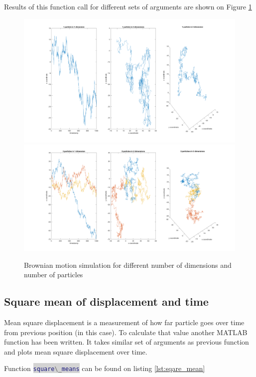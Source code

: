 \documentclass[onecolumn]{article}
\newcommand{\inlinecode}[2]{\colorbox{lightgray}{\lstinline[language=#1]$#2$}}
\begin{document}
\newpage
Results of this function call for different sets of arguments are shown on Figure \ref{fig:brownian}
\begin{figure}[H]
\includegraphics[width=\textwidth]{motion_1p}
\includegraphics[width=\textwidth]{motion_3p}
\caption{Brownian motion simulation for different number of dimensions and number of particles}
\label{fig:brownian}
\end{figure}

\subsection{Square mean of displacement and time}
Mean square displacement is a measurement of how far particle goes over time from previous position (in this case). To calculate that value another MATLAB function has been written. It takes similar set of arguments as previous function and plots mean square displacement over time.

Function \inlinecode{Matlab}{square\_means} can be found on listing \ref{lst:sqare_mean}

\vspace{1em}
\end{document}
